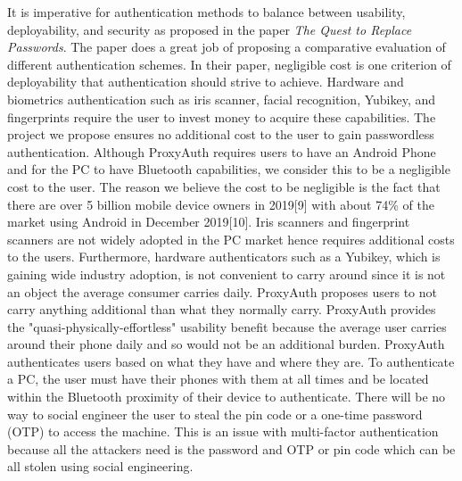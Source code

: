 \documentclass[letterpaper,twocolumn,10pt]{article}
\begin{document}
It is imperative for authentication methods to balance between usability, deployability, and security as proposed in the paper \emph{The Quest to Replace Passwords}. The paper does a great job of proposing a comparative evaluation of different authentication schemes. In their paper, negligible cost is one criterion of deployability that authentication should strive to achieve. Hardware and biometrics authentication such as iris scanner, facial recognition, Yubikey, and fingerprints require the user to invest money to acquire these capabilities. The project we propose ensures no additional cost to the user to gain passwordless authentication. Although ProxyAuth requires users to have an Android Phone and for the PC to have Bluetooth capabilities, we consider this to be a negligible cost to the user. The reason we believe the cost to be negligible is the fact that there are over 5 billion mobile device owners in 2019[9] with about 74\% of the market using Android in December 2019[10]. Iris scanners and fingerprint scanners are not widely adopted in the PC market hence requires additional costs to the users. Furthermore, hardware authenticators such as a Yubikey, which is gaining wide industry adoption, is not convenient to carry around since it is not an object the average consumer carries daily. ProxyAuth proposes users to not carry anything additional than what they normally carry. ProxyAuth provides the "quasi-physically-effortless" usability benefit because the average user carries around their phone daily and so would not be an additional burden. ProxyAuth authenticates users based on what they have and where they are. To authenticate a PC, the user must have their phones with them at all times and be located within the Bluetooth proximity of their device to authenticate. There will be no way to social engineer the user to steal the pin code or a one-time password (OTP) to access the machine. This is an issue with multi-factor authentication because all the attackers need is the password and OTP or pin code which can be all stolen using social engineering. 
\end{document}

